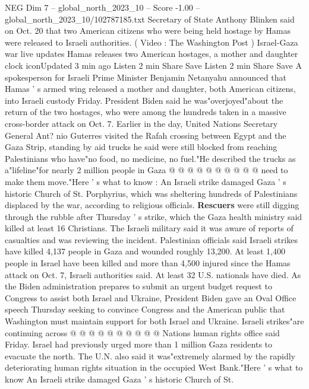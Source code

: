 \begin{textsample}{NEG Dim 7 – global\_north\_2023\_10 – Score -1.00 – global\_north\_2023\_10/102787185.txt}  \label{ex:f7_neg_207}
Secretary of State Anthony Blinken said on Oct. 20 that two American citizens who were being held hostage by Hamas were released to Israeli authorities. ( Video : The Washington Post ) Israel-Gaza war live updates Hamas releases two American hostages, a mother and daughter clock iconUpdated 3 min ago Listen 2 min Share Save Listen 2 min Share Save A spokesperson for Israeli Prime Minister Benjamin Netanyahu announced that Hamas ' s armed wing released a mother and daughter, both American citizens, into Israeli custody Friday.
President Biden said he was"overjoyed"about the return of the two hostages, who were among the hundreds taken in a massive cross-border attack on Oct. 7.
Earlier in the day, United Nations Secretary General Ant? nio Guterres visited the Rafah crossing between Egypt and the Gaza Strip, standing by aid trucks he said were still blocked from reaching Palestinians who have"no food, no medicine, no fuel."He described the trucks as a"lifeline"for nearly 2 million people in Gaza @ @ @ @ @ @ @ @ @ @ need to make them move."Here ' s what to know : An Israeli strike damaged Gaza ' s historic Church of St.
Porphyrius, which was sheltering hundreds of Palestinians displaced by the war, according to religious officials. \textbf{Rescuers} were still digging through the rubble after Thursday ' s strike, which the Gaza health ministry said killed at least 16 Christians.
The Israeli military said it was aware of reports of casualties and was reviewing the incident.
Palestinian officials said Israeli strikes have killed 4,137 people in Gaza and wounded roughly 13,200.
At least 1,400 people in Israel have been killed and more than 4,500 injured since the Hamas attack on Oct. 7, Israeli authorities said.
At least 32 U.S. nationals have died.
As the Biden administration prepares to submit an urgent budget request to Congress to assist both Israel and Ukraine, President Biden gave an Oval Office speech Thursday seeking to convince Congress and the American public that Washington must maintain support for both Israel and Ukraine.
Israeli strikes"are continuing across @ @ @ @ @ @ @ @ @ @ Nations human rights office said Friday.
Israel had previously urged more than 1 million Gaza residents to evacuate the north.
The U.N. also said it was"extremely alarmed by the rapidly deteriorating human rights situation in the occupied West Bank."Here ' s what to know An Israeli strike damaged Gaza ' s historic Church of St.

\end{textsample}
